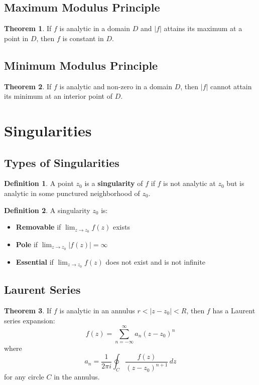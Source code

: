 \documentclass[11pt]{article}
\theoremstyle{definition}
\newtheorem{definition}{Definition}[section]
\newtheorem{theorem}{Theorem}[section]
\begin{document}
\subsection{Maximum Modulus Principle}
\begin{theorem}
If $f$ is analytic in a domain $D$ and $|f|$ attains its maximum at a point in $D$, then $f$ is constant in $D$.
\end{theorem}

\subsection{Minimum Modulus Principle}
\begin{theorem}
If $f$ is analytic and non-zero in a domain $D$, then $|f|$ cannot attain its minimum at an interior point of $D$.
\end{theorem}

\section{Singularities}

\subsection{Types of Singularities}
\begin{definition}
A point $z_0$ is a \textbf{singularity} of $f$ if $f$ is not analytic at $z_0$ but is analytic in some punctured neighborhood of $z_0$.
\end{definition}

\begin{definition}
A singularity $z_0$ is:
\begin{itemize}
    \item \textbf{Removable} if $\lim_{z \to z_0} f(z)$ exists
    \item \textbf{Pole} if $\lim_{z \to z_0} |f(z)| = \infty$
    \item \textbf{Essential} if $\lim_{z \to z_0} f(z)$ does not exist and is not infinite
\end{itemize}
\end{definition}

\subsection{Laurent Series}
\begin{theorem}
If $f$ is analytic in an annulus $r < |z - z_0| < R$, then $f$ has a Laurent series expansion:
$$f(z) = \sum_{n=-\infty}^{\infty} a_n (z - z_0)^n$$
where
$$a_n = \frac{1}{2\pi i} \oint_C \frac{f(z)}{(z - z_0)^{n+1}} \, dz$$
for any circle $C$ in the annulus.
\end{theorem}
\end{document}
